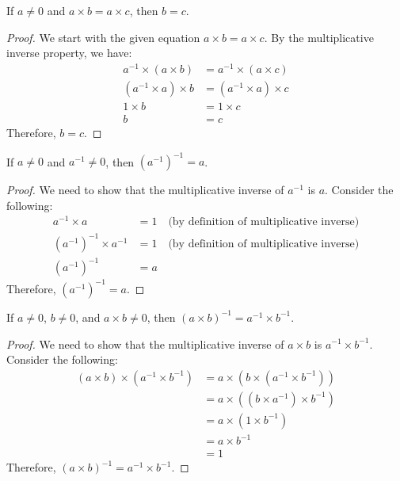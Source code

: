 \documentclass[11pt]{article}
\begin{document}
\begin{proposition}
    If $a \neq 0$ and $a \times b = a \times c$, then $b = c$.
\end{proposition}

\begin{proof}
    We start with the given equation $a \times b = a \times c$. By the multiplicative inverse property, we have:
    \begin{align*}
        a^{-1} \times (a \times b) & = a^{-1} \times (a \times c) \\
        (a^{-1} \times a) \times b & = (a^{-1} \times a) \times c \\
        1 \times b                 & = 1 \times c                 \\
        b                          & = c
    \end{align*}
    Therefore, $b = c$.
\end{proof}

\begin{proposition}
    If $a \neq 0$ and $a^{-1} \neq 0$, then $(a^{-1})^{-1} = a$.
\end{proposition}

\begin{proof}
    We need to show that the multiplicative inverse of $a^{-1}$ is $a$. Consider the following:
    \begin{align*}
        a^{-1} \times a             & = 1 \quad \text{(by definition of multiplicative inverse)} \\
        (a^{-1})^{-1} \times a^{-1} & = 1 \quad \text{(by definition of multiplicative inverse)} \\
        (a^{-1})^{-1}               & = a
    \end{align*}
    Therefore, $(a^{-1})^{-1} = a$.
\end{proof}

\begin{proposition}
    If $a \neq 0$, $b \neq 0$, and $a \times b \neq 0$, then $(a \times b)^{-1} = a^{-1} \times b^{-1}$.
\end{proposition}

\begin{proof}
    We need to show that the multiplicative inverse of $a \times b$ is $a^{-1} \times b^{-1}$. Consider the following:
    \begin{align*}
        (a \times b) \times (a^{-1} \times b^{-1}) & = a \times (b \times (a^{-1} \times b^{-1})) \\
                                                   & = a \times ((b \times a^{-1}) \times b^{-1}) \\
                                                   & = a \times (1 \times b^{-1})                 \\
                                                   & = a \times b^{-1}                            \\
                                                   & = 1
    \end{align*}
    Therefore, $(a \times b)^{-1} = a^{-1} \times b^{-1}$.
\end{proof}
\end{document}
